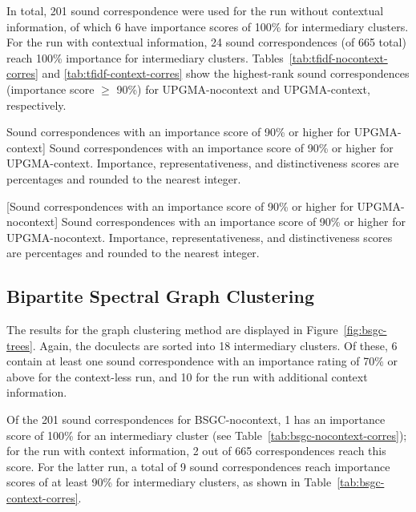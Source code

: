 \documentclass[a4paper]{article}
\begin{document}
In total, 201 sound correspondence were used for the run without contextual information,
of which 6 have importance scores of 100\% for intermediary clusters.
For the run with contextual information,
24 sound correspondences (of 665 total) reach 100\% importance for intermediary clusters.
Tables~\ref{tab:tfidf-nocontext-corres} and \ref{tab:tfidf-context-corres}
show the highest-rank sound correspondences (importance score $\geq$ 90\%)
for UPGMA-nocontext and UPGMA-context, respectively.

\begin{table}[h]
\centering

\caption
[Sound correspondences with an importance score of 90\% or higher for UPGMA-context]
{Sound correspondences with an importance score of 90\% or higher for UPGMA-context.
Importance, representativeness, and distinctiveness scores are percentages
and rounded to the nearest integer.
}
\label{tab:tfidf-context-corres}
\end{table}

\begin{table}[h]
\centering

[Sound correspondences with an importance score of 90\% or higher for UPGMA-nocontext]
{Sound correspondences with an importance score of 90\% or higher for UPGMA-nocontext.
Importance, representativeness, and distinctiveness scores are percentages
and rounded to the nearest integer.
}
\label{tab:tfidf-nocontext-corres}
\end{table}

\subsection{Bipartite Spectral Graph Clustering}

The results for the graph clustering method are
displayed in Figure~\ref{fig:bsgc-trees}.
Again, the doculects are sorted into 18 intermediary clusters.
Of these, 6 contain at least one sound correspondence
with an importance rating of 70\% or above for the context-less run,
and 10 for the run with additional context information.

Of the 201 sound correspondences for BSGC-nocontext,
1 has an importance score of 100\% for an intermediary cluster
(see Table~\ref{tab:bsgc-nocontext-corres});
for the run with context information, 2 out of 665 correspondences reach this score.
For the latter run, a total of 9 sound correspondences
reach importance scores of at least 90\%
for intermediary clusters, as shown in Table~\ref{tab:bsgc-context-corres}.
\end{document}
